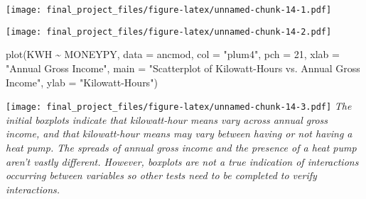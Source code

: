 \documentclass[
]{article}
\newenvironment{Shaded}{\begin{snugshade}}{\end{snugshade}}
\newcommand{\AttributeTok}[1]{\textcolor[rgb]{0.77,0.63,0.00}{#1}}
\newcommand{\DecValTok}[1]{\textcolor[rgb]{0.00,0.00,0.81}{#1}}
\newcommand{\FloatTok}[1]{\textcolor[rgb]{0.00,0.00,0.81}{#1}}
\newcommand{\FunctionTok}[1]{\textcolor[rgb]{0.00,0.00,0.00}{#1}}
\newcommand{\NormalTok}[1]{#1}
\newcommand{\OtherTok}[1]{\textcolor[rgb]{0.56,0.35,0.01}{#1}}
\newcommand{\SpecialCharTok}[1]{\textcolor[rgb]{0.00,0.00,0.00}{#1}}
\newcommand{\StringTok}[1]{\textcolor[rgb]{0.31,0.60,0.02}{#1}}
\begin{document}
\texttt{[image: final\_project\_files/figure-latex/unnamed-chunk-14-1.pdf]}

\begin{Shaded}
\end{Shaded}

\texttt{[image: final\_project\_files/figure-latex/unnamed-chunk-14-2.pdf]}

\begin{Shaded}
\begin{Highlighting}[]
\FunctionTok{plot}\NormalTok{(KWH }\SpecialCharTok{\textasciitilde{}}\NormalTok{ MONEYPY,}
     \AttributeTok{data =}\NormalTok{ ancmod,}
     \AttributeTok{col =} \StringTok{"plum4"}\NormalTok{,}
     \AttributeTok{pch =} \DecValTok{21}\NormalTok{,}
     \AttributeTok{xlab =} \StringTok{"Annual Gross Income"}\NormalTok{,}
     \AttributeTok{main =} \StringTok{"Scatterplot of Kilowatt{-}Hours vs. Annual Gross Income"}\NormalTok{,}
     \AttributeTok{ylab =} \StringTok{"Kilowatt{-}Hours"}\NormalTok{)}
\end{Highlighting}
\end{Shaded}

\texttt{[image: final\_project\_files/figure-latex/unnamed-chunk-14-3.pdf]}
\emph{The initial boxplots indicate that kilowatt-hour means vary across
annual gross income, and that kilowatt-hour means may vary between
having or not having a heat pump. The spreads of annual gross income and
the presence of a heat pump aren't vastly different. However, boxplots
are not a true indication of interactions occurring between variables so
other tests need to be completed to verify interactions.}
\end{document}
